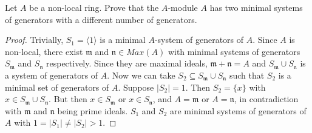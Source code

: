 \begin{problem}
    Let $A$ be a non-local ring.
    Prove that the $A$-module $A$ has two minimal systems of generators with a different number of generators.
    \begin{sol}
        \begin{proof}
            Trivially, $S_1 = \langle1\rangle$ is a minimal $A$-system of generators of $A$.
            Since $A$ is non-local, there exist $\mathfrak{m}$ and $\mathfrak{n} \in Max(A)$ with minimal systems of
            generators $S_\mathfrak{m}$ and $S_\mathfrak{n}$ respectively.
            Since they are maximal ideals, $\mathfrak{m} + \mathfrak{n} = A$ and $S_\mathfrak{m} \cup S_\mathfrak{n}$ is a
            system of generators of $A$.
            Now we can take $S_2 \subseteq S_\mathfrak{m} \cup S_\mathfrak{n}$ such that $S_2$ is a minimal set of
            generators of $A$.
            Suppose $|S_2| = 1$.
            Then $S_2 = \{x\}$ with $x \in S_\mathfrak{m} \cup S_\mathfrak{n}$.
            But then $x \in S_\mathfrak{m}$ or $x \in S_\mathfrak{n}$, and $A = \mathfrak{m}$ or $A = \mathfrak{n}$, in
            contradiction with $\mathfrak{m}$ and $\mathfrak{n}$ being prime ideals.
            $S_1$ and $S_2$ are minimal systems of generators of $A$ with $1 = |S_1| \neq |S_2| > 1$.
        \end{proof}
    \end{sol}
\end{problem}